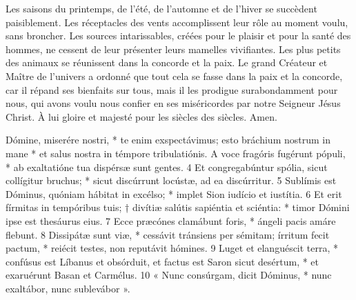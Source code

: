 
Les saisons du printemps, de l'été, de l'automne et de l'hiver se succèdent paisiblement.
Les réceptacles des vents accomplissent leur rôle au moment voulu, sans broncher.
Les sources intarissables, créées pour le plaisir et pour la santé des hommes,
	ne cessent de leur présenter leurs mamelles vivifiantes.
Les plus petits des animaux se réunissent dans la concorde et la paix.
Le grand Créateur et Maître de l'univers
	a ordonné que tout cela se fasse dans la paix et la concorde,
	car il répand ses bienfaits sur tous, mais il les prodigue surabondamment pour nous,
	qui avons voulu nous confier en ses miséricordes par notre Seigneur Jésus Christ.
À lui gloire et majesté pour les siècles des siècles. Amen.





Dómine, miserére nostri, *
te enim exspectávimus;
esto bráchium nostrum in mane *
et salus nostra in témpore tribulatiónis.
A voce fragóris fugérunt pópuli, *
ab exaltatióne tua dispérsæ sunt gentes.
4 Et congregabúntur spólia, sicut collígitur bruchus; *
sicut discúrrunt locústæ, ad ea discúrritur.
5 Sublímis est Dóminus, quóniam hábitat in excélso; *
implet Sion iudício et iustítia.
6 Et erit fírmitas in tempóribus tuis; †
divítiæ salútis sapiéntia et sciéntia: *
timor Dómini ipse est thesáurus eius.
7 Ecce præcónes clamábunt foris, *
ángeli pacis amáre flebunt.
8 Dissipátæ sunt viæ, *
cessávit tránsiens per sémitam;
írritum fecit pactum, *
reiécit testes,
non reputávit hómines.
9 Luget et elanguéscit terra, *
confúsus est Líbanus et obsórduit,
et factus est Saron sicut desértum, *
et exaruérunt Basan et Carmélus.
10 « Nunc consúrgam, dicit Dóminus, *
nunc exaltábor, nunc sublevábor ».

